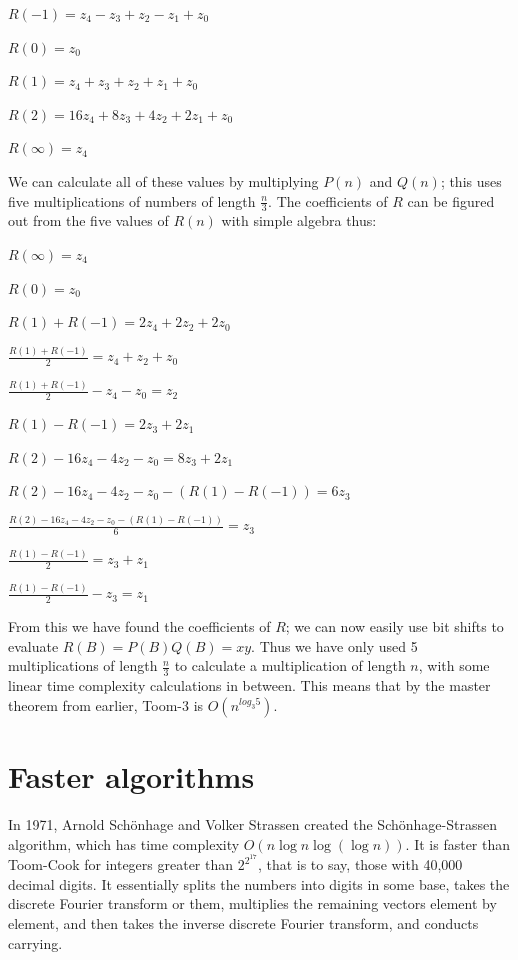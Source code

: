 \documentclass{article}
\begin{document}
\(R(-1)=z_4-z_3+z_2-z_1+z_0\)

\(R(0)=z_0\)

\(R(1)=z_4+z_3+z_2+z_1+z_0\)

\(R(2)=16z_4+8z_3+4z_2+2z_1+z_0\)

\(R(\infty)=z_4\)

We can calculate all of these values by multiplying \(P(n)\) and \(Q(n)\); this uses five multiplications of numbers of length \(\frac{n}{3}\). The coefficients of \(R\) can be figured out from the five values of \(R(n)\) with simple algebra thus:

\(R(\infty)=z_4\)

\(R(0)=z_0\)

\(R(1)+R(-1)=2z_4+2z_2+2z_0\)

\(\frac{R(1)+R(-1)}{2}=z_4+z_2+z_0\)

\(\frac{R(1)+R(-1)}{2}-z_4-z_0=z_2\)

\(R(1)-R(-1)=2z_3+2z_1\)

\(R(2)-16z_4-4z_2-z_0=8z_3+2z_1\)

\(R(2)-16z_4-4z_2-z_0-(R(1)-R(-1))=6z_3\)

\(\frac{R(2)-16z_4-4z_2-z_0-(R(1)-R(-1))}{6}=z_3\)

\(\frac{R(1)-R(-1)}{2}=z_3+z_1\)

\(\frac{R(1)-R(-1)}{2}-z_3=z_1\)

From this we have found the coefficients of \(R\); we can now easily use bit shifts to evaluate \(R(B)=P(B)Q(B)=xy\). Thus we have only used 5 multiplications of length \(\frac{n}{3}\) to calculate a multiplication of length \(n\), with some linear time complexity calculations in between. This means that by the master theorem from earlier, Toom-3 is \(O(n^{log_{3}5})\).

\section{Faster algorithms}

In 1971, Arnold Sch\"onhage and Volker Strassen created the Sch\"onhage-Strassen algorithm, which has time complexity \(O(n\log{}n\log(\log{}n))\). It is faster than Toom-Cook for integers greater than \(2^{2^17}\), that is to say, those with 40,000 decimal digits. It essentially splits the numbers into digits in some base, takes the discrete Fourier transform or them, multiplies the remaining vectors element by element, and then takes the inverse discrete Fourier transform, and conducts carrying.
\end{document}

